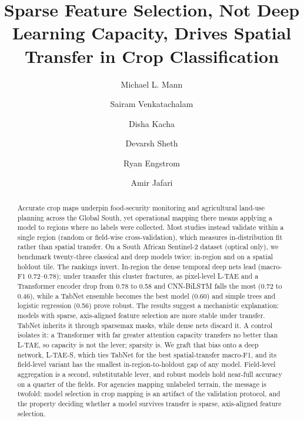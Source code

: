 \documentclass[preprint,authoryear]{elsarticle}
\begin{document}
\begin{frontmatter}

\title{Sparse Feature Selection, Not Deep Learning Capacity, Drives Spatial Transfer in Crop Classification}

\author[gwgeo]{Michael L. Mann}
\author[gwds]{Sairam Venkatachalam}
\author[gwds]{Disha Kacha}
\author[gwds]{Devarsh Sheth}
\author[gwgeo]{Ryan Engstrom}
\author[gwds]{Amir Jafari}



\begin{abstract}
Accurate crop maps underpin food-security monitoring and agricultural land-use planning across the Global South, yet operational mapping there means applying a model to regions where no labels were collected. Most studies instead validate within a single region (random or field-wise cross-validation), which measures in-distribution fit rather than spatial transfer. On a South African Sentinel-2 dataset (optical only), we benchmark twenty-three classical and deep models twice: in-region and on a spatial holdout tile. The rankings invert. In-region the dense temporal deep nets lead (macro-F1 0.72--0.78); under transfer this cluster fractures, as pixel-level L-TAE and a Transformer encoder drop from 0.78 to 0.58 and CNN-BiLSTM falls the most (0.72 to 0.46), while a TabNet ensemble becomes the best model (0.60) and simple trees and logistic regression (0.56) prove robust. The results suggest a mechanistic explanation: models with sparse, axis-aligned feature selection are more stable under transfer. TabNet inherits it through sparsemax masks, while dense nets discard it. A control isolates it: a Transformer with far greater attention capacity transfers no better than L-TAE, so capacity is not the lever; sparsity is. We graft that bias onto a deep network, L-TAE-S, which ties TabNet for the best spatial-transfer macro-F1, and its field-level variant has the smallest in-region-to-holdout gap of any model. Field-level aggregation is a second, substitutable lever, and robust models hold near-full accuracy on a quarter of the fields. For agencies mapping unlabeled terrain, the message is twofold: model selection in crop mapping is an artifact of the validation protocol, and the property deciding whether a model survives transfer is sparse, axis-aligned feature selection.
\end{abstract}


\end{frontmatter}
\end{document}
